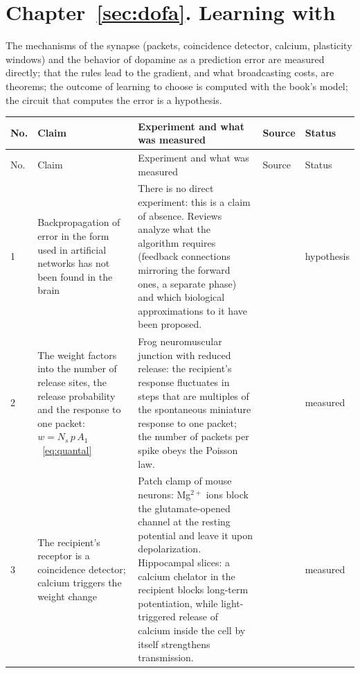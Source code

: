 \section{Chapter~\ref{sec:dofa}. Learning with }

The mechanisms of the synapse (packets, coincidence detector, calcium, plasticity windows) and the behavior of dopamine as a prediction error are measured directly; that the rules lead to the gradient, and what broadcasting costs, are theorems; the outcome of learning to choose is computed with the book's model; the circuit that computes the error is a hypothesis.

{\footnotesize
\setlength{\tabcolsep}{3pt}\renewcommand{\arraystretch}{1.15}
\begin{longtable}{>{\raggedright}p{0.5cm}>{\raggedright}p{4.0cm}>{\raggedright}p{5.6cm}>{\raggedright}p{2.3cm}>{\raggedright\arraybackslash}p{1.7cm}}
\toprule
No. & Claim & Experiment and what was measured & Source & Status \\
\midrule\endfirsthead
\toprule
No. & Claim & Experiment and what was measured & Source & Status \\
\midrule\endhead
1 & Backpropagation of error in the form used in artificial networks has not been found in the brain & There is no direct experiment: this is a claim of absence. Reviews analyze what the algorithm requires (feedback connections mirroring the forward ones, a separate phase) and which biological approximations to it have been proposed. & \cite{Lillicrap2020, WhittingtonBogacz2019} & hypothesis \\
2 & The weight factors into the number of release sites, the release probability and the response to one packet: $w=N_s\,p\,A_1$~\eqref{eq:quantal} & Frog neuromuscular junction with reduced release: the recipient's response fluctuates in steps that are multiples of the spontaneous miniature response to one packet; the number of packets per spike obeys the Poisson law. & \cite{delCastillo1954} & measured \\
3 & The recipient's receptor is a coincidence detector; calcium triggers the weight change & Patch clamp of mouse neurons: Mg$^{2+}$ ions block the glutamate-opened channel at the resting potential and leave it upon depolarization. Hippocampal slices: a calcium chelator in the recipient blocks long-term potentiation, while light-triggered release of calcium inside the cell by itself strengthens transmission. & \cite{Nowak1984, Malenka1988calcium} & measured \\

\end{longtable}}
